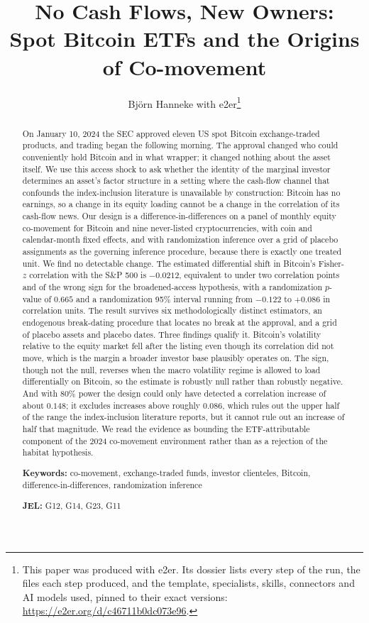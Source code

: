 \documentclass[12pt,a4paper]{article}
\title{No Cash Flows, New Owners:\\ Spot Bitcoin ETFs and the Origins of Co-movement}
\author{Björn Hanneke with e2er\thanks{This paper was produced with e2er. Its dossier lists every step of the run, the files each step produced, and the template, specialists, skills, connectors and AI models used, pinned to their exact versions: \url{https://e2er.org/d/c46711b0dc073e96}.}}
\date{}
\begin{document}
\maketitle

\begin{abstract}
\noindent On January 10, 2024 the SEC approved eleven US spot Bitcoin exchange-traded products, and trading began the following morning. The approval changed who could conveniently hold Bitcoin and in what wrapper; it changed nothing about the asset itself. We use this access shock to ask whether the identity of the marginal investor determines an asset's factor structure in a setting where the cash-flow channel that confounds the index-inclusion literature is unavailable by construction: Bitcoin has no earnings, so a change in its equity loading cannot be a change in the correlation of its cash-flow news. Our design is a difference-in-differences on a panel of monthly equity co-movement for Bitcoin and nine never-listed cryptocurrencies, with coin and calendar-month fixed effects, and with randomization inference over a grid of placebo assignments as the governing inference procedure, because there is exactly one treated unit. We find no detectable change. The estimated differential shift in Bitcoin's Fisher-$z$ correlation with the S\&P 500 is
$-0.0212$, equivalent to under two correlation points and of the wrong sign for the broadened-access hypothesis, with a randomization $p$-value of
$0.665$ and a randomization 95\% interval running from
$-0.122$ to $+0.086$ in correlation units. The result survives six methodologically distinct estimators, an endogenous break-dating procedure that locates no break at the approval, and a grid of placebo assets and placebo dates. Three findings qualify it. Bitcoin's volatility relative to the equity market fell after the listing even though its correlation did not move, which is the margin a broader investor base plausibly operates on. The sign, though not the null, reverses when the macro volatility regime is allowed to load differentially on Bitcoin, so the estimate is robustly null rather than robustly negative. And with 80\% power the design could only have detected a correlation increase of about
$0.148$; it excludes increases above roughly $0.086$, which rules out the upper half of the range the index-inclusion literature reports, but it cannot rule out an increase of half that magnitude. We read the evidence as bounding the ETF-attributable component of the 2024 co-movement environment rather than as a rejection of the habitat hypothesis.

\bigskip
\noindent\textbf{Keywords:} co-movement, exchange-traded funds, investor clienteles, Bitcoin, difference-in-differences, randomization inference

\noindent\textbf{JEL:} G12, G14, G23, G11
\end{abstract}
\end{document}

